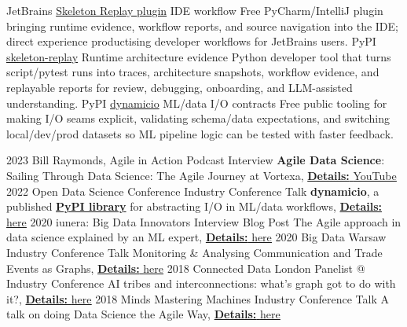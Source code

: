 \documentclass[]{../../friggeri-cv}
\begin{document}
\begin{entrylist2}
	\entrytwo
		{\small JetBrains}
		{\small \href{https://plugins.jetbrains.com/plugin/32807-skeleton-replay}{Skeleton Replay plugin}}
		{\small IDE workflow}
		{\footnotesize Free PyCharm/IntelliJ plugin bringing runtime evidence, workflow reports, and source navigation into the IDE; direct experience productising developer workflows for JetBrains users.}
	\entrytwo
		{\small PyPI}
		{\small \href{https://pypi.org/project/skeleton-replay/}{skeleton-replay}}
		{\small Runtime architecture evidence}
		{\footnotesize Python developer tool that turns script/pytest runs into traces, architecture snapshots, workflow evidence, and replayable reports for review, debugging, onboarding, and LLM-assisted understanding.}
	\entrytwo
		{\small PyPI}
		{\small \href{https://pypi.org/project/dynamicio/}{dynamicio}}
		{\small ML/data I/O contracts}
		{\footnotesize Free public tooling for making I/O seams explicit, validating schema/data expectations, and switching local/dev/prod datasets so ML pipeline logic can be tested with faster feedback.}
\end{entrylist2}
\begin{entrylist2}
	\entrytwo
		{\small 2023}
		{\small Bill Raymonds, Agile in Action}
		{\small Podcast Interview}
		{\small \textbf{Agile Data Science}: Sailing Through Data Science: The Agile Journey at Vortexa, \underline{\textbf{Details:} \href{https://christos-hadjinikolis.github.io//2023/10/31/Agile-In-Action.html}{YouTube}}}
	\entrytwo
		{\small 2022}
		{\small Open Data Science Conference}
		{\small Industry Conference Talk}
		{\small \textbf{dynamicio}, a published \href{https://pypi.org/project/dynamicio/}{\textbf{PyPI library}} for abstracting I/O in ML/data workflows, \underline{\textbf{Details:} \href{https://odsc.com/speakers/dynamicio-a-pandas-i-o-wrapper-why-you-should-start-your-ml-ops-journey-with-wrapping-your-i-o/}{here}}}
	\entrytwo
		{\small 2020}
		{\small iunera: Big Data Innovators}
		{\small Interview Blog Post}
		{\small The Agile approach in data science explained by an ML expert, \underline{\textbf{Details:} \href{https://www.iunera.com/kraken/interviews/the-agile-approach-in-data-science-explained-by-an-ml-expert/}{here}}}
	\entrytwo
		{\small 2020}
		{\small Big Data Warsaw}
		{\small Industry Conference Talk}
		{\small Monitoring \& Analysing Communication and Trade Events as Graphs, \underline{\textbf{Details:} \href{https://bigdatatechwarsaw.eu/agenda/}{here}}}
	\entrytwo
		{\small 2018}
		{\small Connected Data London}
		{\small Panelist @ Industry Conference}
		{\small AI tribes and interconnections: what's graph got to do with it?, \underline{\textbf{Details:} \href{http://connected-data.london/2018/09/23/ai-tribes-and-interconnections-whats-graph-got-to-do-with-it/}{here}}}
	\entrytwo
		{\small 2018}
		{\small Minds Mastering Machines}
		{\small Industry Conference Talk}
		{\small A talk on doing Data Science the Agile Way, \underline{\textbf{Details:} \href{https://2018.mcubed.london/sessions/data-science-agile-way/}{here}}}
\end{entrylist2}
\end{document}
